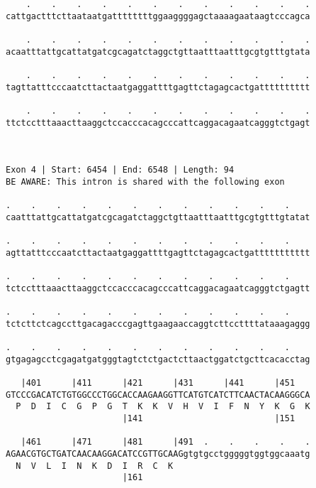 \documentclass{article}
\begin{document}
\begin{Verbatim}
    .    .    .    .    .    .    .    .    .    .    .    .
cattgactttcttaataatgattttttttggaaggggagctaaaagaataagtcccagca
                                                            
    .    .    .    .    .    .    .    .    .    .    .    .
acaatttattgcattatgatcgcagatctaggctgttaatttaatttgcgtgtttgtata
                                                            
    .    .    .    .    .    .    .    .    .    .    .    .
tagttatttcccaatcttactaatgaggattttgagttctagagcactgatttttttttt
                                                            
    .    .    .    .    .    .    .    .    .    .    .    .
ttctcctttaaacttaaggctccacccacagcccattcaggacagaatcagggtctgagt
                                                            
                                                            
 
Exon 4 | Start: 6454 | End: 6548 | Length: 94
BE AWARE: This intron is shared with the following exon
 
.    .    .    .    .    .    .    .    .    .    .    .    
caatttattgcattatgatcgcagatctaggctgttaatttaatttgcgtgtttgtatat
                                                            
.    .    .    .    .    .    .    .    .    .    .    .    
agttatttcccaatcttactaatgaggattttgagttctagagcactgattttttttttt
                                                            
.    .    .    .    .    .    .    .    .    .    .    .    
tctcctttaaacttaaggctccacccacagcccattcaggacagaatcagggtctgagtt
                                                            
.    .    .    .    .    .    .    .    .    .    .    .    
tctcttctcagccttgacagacccgagttgaagaaccaggtcttccttttataaagaggg
                                                            
.    .    .    .    .    .    .    .    .    .    .    .    
gtgagagcctcgagatgatgggtagtctctgactcttaactggatctgcttcacacctag
                                                            
   |401      |411      |421      |431      |441      |451   
GTCCCGACATCTGTGGCCCTGGCACCAAGAAGGTTCATGTCATCTTCAACTACAAGGGCA
  P  D  I  C  G  P  G  T  K  K  V  H  V  I  F  N  Y  K  G  K
                       |141                          |151   
  
   |461      |471      |481      |491  .    .    .    .    .
AGAACGTGCTGATCAACAAGGACATCCGTTGCAAGgtgtgcctgggggtggtggcaaatg
  N  V  L  I  N  K  D  I  R  C  K                           
                       |161                                 
  

\end{Verbatim}
\end{document}
